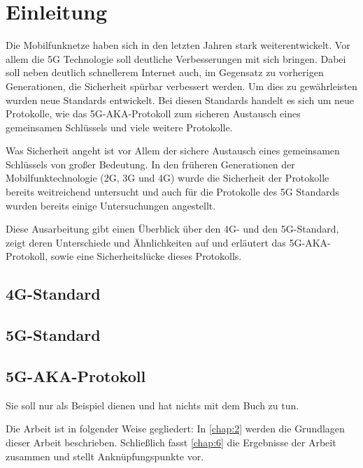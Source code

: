 \chapter{Einleitung}
\label{chap:1}

Die Mobilfunknetze haben sich in den letzten Jahren stark weiterentwickelt. %
Vor allem die 5G Technologie soll deutliche Verbesserungen mit sich bringen. 
Dabei soll neben deutlich schnellerem Internet auch, im Gegensatz zu vorherigen Generationen, die Sicherheit sp\"urbar verbessert werden.
Um dies zu gew\"ahrleisten wurden neue Standards entwickelt. 
Bei diesen Standards handelt es sich um neue Protokolle, wie das 5G-AKA-Protokoll zum sicheren Austausch eines gemeinsamen Schl\"ussels und viele weitere Protokolle.

Was Sicherheit angeht ist vor Allem der sichere Austausch eines gemeinsamen Schl\"ussels von gro{\ss}er Bedeutung. 
In den fr\"uheren Generationen der Mobilfunktechnologie (2G, 3G und 4G) wurde die Sicherheit der Protokolle bereits weitreichend untersucht und auch f\"ur die Protokolle des 5G Standards wurden bereits einige Untersuchungen angestellt. %

Diese Ausarbeitung gibt einen \"Uberblick \"uber den 4G- und den 5G-Standard, zeigt deren Unterschiede und \"Ahnlichkeiten auf und erl\"autert das 5G-AKA-Protokoll, sowie eine Sicherheitsl\"ucke dieses Protokolls.

\section{4G-Standard}

\section{5G-Standard}

\section{5G-AKA-Protokoll}

Sie soll nur als Beispiel dienen und hat nichts mit dem Buch \cite{WSPA} zu tun.


Die Arbeit ist in folgender Weise gegliedert:
In \cref{chap:2} werden die Grundlagen dieser Arbeit beschrieben.
Schließlich fasst \cref{chap:6} die Ergebnisse der Arbeit zusammen und stellt Anknüpfungspunkte vor.
